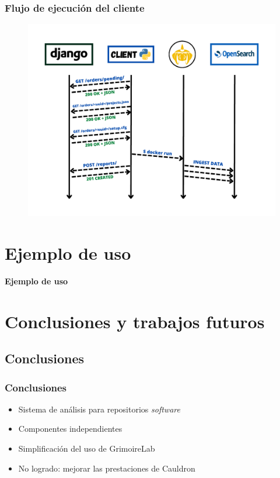 \documentclass[
	11pt, %
	aspectratio=169, %
]{beamer}
\begin{document}

\begin{frame}
	\frametitle{Flujo de ejecución del cliente}

	\begin{figure}
		\includegraphics[width=0.55\linewidth]{grimoirebots_backend.pdf}
	\end{figure}
\end{frame}


\section{Ejemplo de uso}

\begin{frame}
	\centering \Huge \color{beamer@blendedblue}
	\textbf{Ejemplo de uso}
\end{frame}


\section{Conclusiones y trabajos futuros}


\subsection[]{Conclusiones}

\begin{frame}
	\frametitle{Conclusiones}

	\begin{itemize}
		\item Sistema de análisis para repositorios \emph{software}
		\item Componentes independientes
		\item Simplificación del uso de GrimoireLab
		\item \alert{No logrado}: mejorar las prestaciones de Cauldron
	\end{itemize}
\end{frame}
\end{document}
